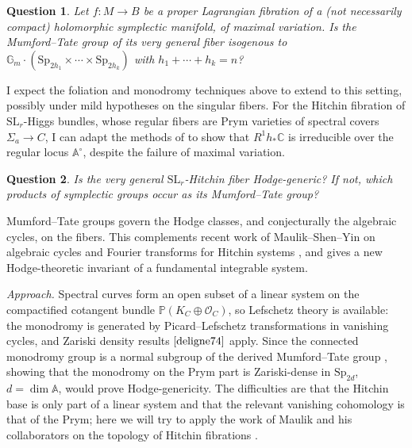 \documentclass[11pt]{article}
\newcommand{\C}{\mathbb{C}}
\newcommand{\Gm}{\mathbb{G}_m}
\newcommand{\bbA}{\mathbb{A}}
\newcommand{\bbP}{\mathbb{P}}
\newcommand{\cO}{\mathcal{O}}
\newcommand{\Sp}{\mathrm{Sp}}
\newcommand{\SL}{\mathrm{SL}}
\theoremstyle{compact}
\newtheorem{question}{Question}
\begin{document}
\begin{question}\label{q:noncompact}
Let $f\colon M\to B$ be a proper Lagrangian fibration of a (not necessarily compact)
holomorphic symplectic manifold, of maximal variation. Is the Mumford--Tate group of its
very general fiber isogenous to $\Gm\cdot(\Sp_{2h_1}\times\cdots\times\Sp_{2h_k})$ with
$h_1+\cdots+h_k=n$?
\end{question}

I expect the foliation and monodromy techniques above to extend to this setting, possibly
under mild hypotheses on the singular fibers. For the Hitchin fibration of
$\SL_r$-Higgs bundles, whose regular fibers are Prym varieties of spectral covers
$\Sigma_a\to C$, I can adapt the methods of \cite{varvak25} to show that $R^1h_*\C$ is
irreducible over the regular locus $\bbA^\circ$, despite the failure of maximal variation.

\begin{question}\label{q:hitchin}
Is the very general $\SL_r$-Hitchin fiber Hodge-generic? If not, which products of
symplectic groups occur as its Mumford--Tate group?
\end{question}

Mumford--Tate groups govern the Hodge classes, and conjecturally the
algebraic cycles, on the fibers. This complements recent work of Maulik--Shen--Yin on
algebraic cycles and Fourier transforms for Hitchin systems \cite{msy-cycles,msy-fourier},
and gives a new Hodge-theoretic invariant of a fundamental integrable system.

\emph{Approach.} Spectral curves form an open subset of a linear system on the
compactified cotangent bundle $\bbP(K_C\oplus\cO_C)$, so Lefschetz theory is available: the
monodromy is generated by Picard--Lefschetz transformations in vanishing cycles, and
Zariski density results $\cite[\mathrm{Lemma\ 4.4.2}^a]{deligne74}$ apply. Since the connected monodromy group is a
normal subgroup of the derived Mumford--Tate group \cite{andre92}, showing that the
monodromy on the Prym part is Zariski-dense in $\Sp_{2d}$, $d=\dim\bbA$, would prove
Hodge-genericity. The difficulties
are that the Hitchin base is only part of a linear system and that the relevant vanishing
cohomology is that of the Prym; here we will try to apply the work of Maulik and his
collaborators on the topology of Hitchin fibrations \cite{dCMS22,maulik-shen24}.
\end{document}
